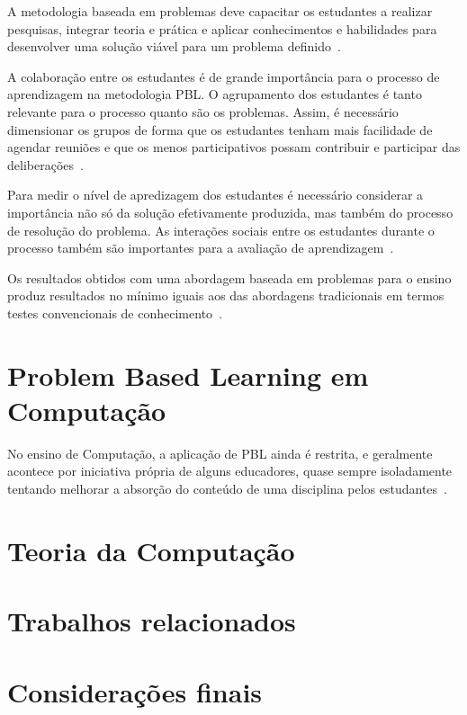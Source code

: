 A metodologia baseada em problemas deve capacitar os estudantes a
realizar pesquisas, integrar teoria e prática e aplicar conhecimentos
e habilidades para desenvolver uma solução viável para
um problema definido~\cite{savery2015overview}.


A colaboração entre os estudantes é de grande importância para o
processo de aprendizagem na metodologia PBL.
O agrupamento dos estudantes é tanto relevante para o processo quanto
são os problemas. Assim, é necessário dimensionar os grupos de forma
que os estudantes tenham mais facilidade de agendar reuniões e que
os menos participativos possam contribuir e participar das
deliberações~\cite{savery2015overview, albanese2010problem}.

Para medir o nível de apredizagem dos estudantes é necessário considerar
a importância não só da solução efetivamente produzida, mas também do
processo de resolução do problema.
As interações sociais entre os estudantes durante
o processo também são importantes para a
avaliação de aprendizagem~\cite{albanese2010problem}.

Os resultados obtidos com uma abordagem baseada em problemas para o ensino
produz resultados no mínimo iguais aos das abordagens tradicionais em
termos testes convencionais de conhecimento~\cite{savery2015overview}.

\section{Problem Based Learning em Computação}
No ensino de Computação, a aplicação de PBL ainda é restrita, e geralmente
acontece por iniciativa própria de alguns educadores,
quase sempre isoladamente tentando melhorar a
absorção do conteúdo de uma disciplina
pelos estudantes~\cite{wood2003problem, o2012practical}.

\section{Teoria da Computação}
\section{Trabalhos relacionados}
\section{Considerações finais}
